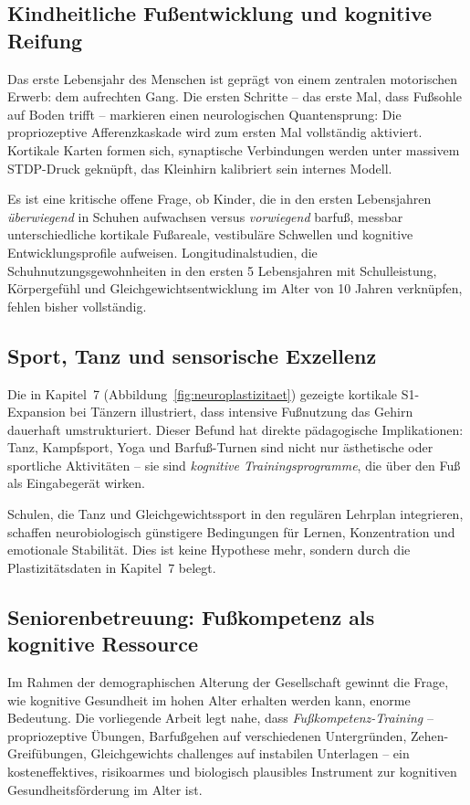 ﻿\documentclass[12pt,a4paper]{report}
\theoremstyle{plain}
\theoremstyle{definition}
\theoremstyle{remark}
\begin{document}
\subsection{Kindheitliche Fußentwicklung und kognitive Reifung}

Das erste Lebensjahr des Menschen ist geprägt von einem
zentralen motorischen Erwerb: dem aufrechten Gang. Die ersten
Schritte -- das erste Mal, dass Fußsohle auf Boden trifft --
markieren einen neurologischen Quantensprung: Die propriozeptive
Afferenzkaskade wird zum ersten Mal vollständig aktiviert.
Kortikale Karten formen sich, synaptische Verbindungen werden
unter massivem STDP-Druck geknüpft, das Kleinhirn kalibriert
sein internes Modell.

Es ist eine kritische offene Frage, ob Kinder, die in den ersten
Lebensjahren \emph{überwiegend} in Schuhen aufwachsen versus
\emph{vorwiegend} barfuß, messbar unterschiedliche kortikale
Fußareale, vestibuläre Schwellen und kognitive Entwicklungsprofile
aufweisen. Longitudinalstudien, die Schuhnutzungsgewohnheiten
in den ersten 5 Lebensjahren mit Schulleistung, Körpergefühl und
Gleichgewichtsentwicklung im Alter von 10 Jahren verknüpfen,
fehlen bisher vollständig.

\subsection{Sport, Tanz und sensorische Exzellenz}

Die in Kapitel~7 (Abbildung~\ref{fig:neuroplastizitaet}) gezeigte
kortikale S1-Expansion bei Tänzern illustriert, dass intensive
Fußnutzung das Gehirn dauerhaft umstrukturiert. Dieser Befund hat
direkte pädagogische Implikationen: Tanz, Kampfsport, Yoga und
Barfuß-Turnen sind nicht nur ästhetische oder sportliche
Aktivitäten -- sie sind \emph{kognitive Trainingsprogramme},
die über den Fuß als Eingabegerät wirken.

Schulen, die Tanz und Gleichgewichtssport in den regulären
Lehrplan integrieren, schaffen neurobiologisch günstigere
Bedingungen für Lernen, Konzentration und emotionale Stabilität.
Dies ist keine Hypothese mehr, sondern durch die Plastizitätsdaten
in Kapitel~7 belegt.

\subsection{Seniorenbetreuung: Fußkompetenz als kognitive Ressource}

Im Rahmen der demographischen Alterung der Gesellschaft gewinnt
die Frage, wie kognitive Gesundheit im hohen Alter erhalten werden
kann, enorme Bedeutung. Die vorliegende Arbeit legt nahe, dass
\emph{Fußkompetenz-Training} -- propriozeptive Übungen, Barfußgehen
auf verschiedenen Untergründen, Zehen-Greifübungen, Gleichgewichts\-
challenges auf instabilen Unterlagen -- ein kosteneffektives,
risikoarmes und biologisch plausibles Instrument zur kognitiven
Gesundheitsförderung im Alter ist.
\end{document}
